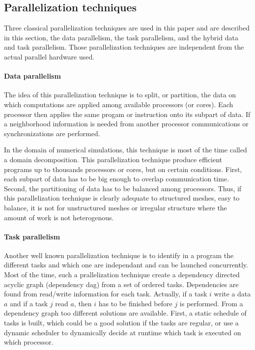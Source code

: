 \subsection{Parallelization techniques}
\label{sect:parallel}
Three classical parallelization techniques are used in this paper and are described in this section, the data parallelism, the task parallelism, and the hybrid data and task parallelism. Those parallelization techniques are independent from the actual parallel hardware used.

\paragraph{Data parallelism} The idea of this parallelization technique is to split, or partition, the data on which computations are applied among available processors (or cores). Each processor then applies the same progam or instruction onto its subpart of data. If a neighborhood information is needed from another processor communications or synchronizations are performed. 

In the domain of numerical simulations, this technique is most of the time called a domain decomposition. This parallelization technique produce efficient programs up to thousands processors or cores, but on certain conditions. First, each subpart of data has to be big enough to overlap communication time. Second, the partitioning of data has to be balanced among processors. Thus, if this parallelization technique is clearly adequate to structured meshes, easy to balance, it is not for unstructured meshes or irregular structure where the amount of work is not heterogenous.

\paragraph{Task parallelism} Another well known parallelization technique is to identify in a program the different tasks and which one are independant and can be launched concurrently. Most of the time, such a prallelization technique create a dependency directed acyclic graph (dependency dag) from a set of ordered tasks. Dependencies are found from read/write information for each task. Actually, if a task $i$ write a data $a$ and if a task $j$ read $a$, then $i$ has to be finished before $j$ is performed. From a dependency graph too different solutions are available. First, a static schedule of tasks is built, which could be a good solution if the tasks are regular, or use a dynamic scheduler to dynamically decide at runtime which task is executed on which processor.

